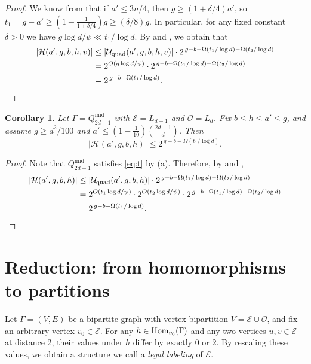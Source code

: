 \documentclass{amsart}
\newtheorem{cor}[thm]{Corollary}
\theoremstyle{definition}
\newcommand{\cO}{\mathcal{O} }
\newcommand{\cE}{\mathcal{E} }
\newcommand{\0}[0]{\emptyset}
\newcommand{\Hom}[0]{\mbox{\rm{Hom}}}
\begin{document}
\begin{proof}
    We know from  that if $a'\leq 3n/4$, then $g\geq (1+\delta/4)a'$, so $t_1=g-a'\geq (1-\frac{1}{1+\delta/4})g\geq   (\delta/8)g$. In particular, for any fixed constant $\delta>0$ we have $g\log d/\psi\ll t_1/\log d$. By  and , we obtain that
\begin{align*}
       |\mathcal H(a',g,b,h,v)|&\leq |\mathcal U_{\mathrm{quad}}(a',g,b,h,v)|\cdot 2^{\,g-b- \Omega(t_1/\log d)- \Omega(t_2/\log d)}\\
       &=2^{O(g\log d/\psi)}\cdot 2^{\,g-b- \Omega(t_1/\log d)- \Omega(t_2/\log d)}\\
       &=2^{\,g-b-\Omega(t_1/\log d)}. \qedhere
   \end{align*}
\end{proof}

\begin{cor}\label{cor:H-middle-layers}
Let $\Gamma=Q_{2d-1}^{\mathrm{mid}}$ with $\cE=L_{d-1}$ and $\cO=L_{d}$.
Fix $b\le h\le a'\le g$, and assume $g\ge d^2/100$ and $a'\leq (1-\frac{1}{10})\binom{2d-1}{d}$.
Then
\[
|\mathcal H(a',g,b,h)|
\le
2^{\,g-b-\Omega(t_1/\log d)}.
\]
\end{cor}
\begin{proof}
    Note that $Q_{2d-1}^{\mathrm{mid}}$ satisfies \eqref{eq:t} by  (a). Therefore, by   and ,
   \begin{align*}
       |\mathcal H(a',g,b,h)|&\leq |\mathcal U_{\mathrm{quad}}(a',g,b,h)|\cdot 2^{\,g-b- \Omega(t_1/\log d)- \Omega(t_2/\log d)}\\
       &=2^{O(t_1\log d/\psi)}\cdot 2^{O(t_2\log d/\psi)}\cdot 2^{\,g-b- \Omega(t_1/\log d)- \Omega(t_2/\log d)}\\
       &=2^{\,g-b-\Omega(t_1/\log d)}. \qedhere
   \end{align*}
\end{proof}

\section{Reduction: from homomorphisms to partitions}\label{sec:reduction}

Let $\Gamma=(V, E)$ be a bipartite graph with vertex bipartition $V=\cE\cup\cO$, and fix an arbitrary vertex $v_0\in\cE$. For any $h\in\Hom_{v_0}(\Gamma)$ and any two vertices $u, v \in \cE$ at distance 2, their values under $h$ differ by exactly 0 or 2. By rescaling these values, we obtain a structure we call a \textit{legal labeling} of $\cE$. 
\end{document}
